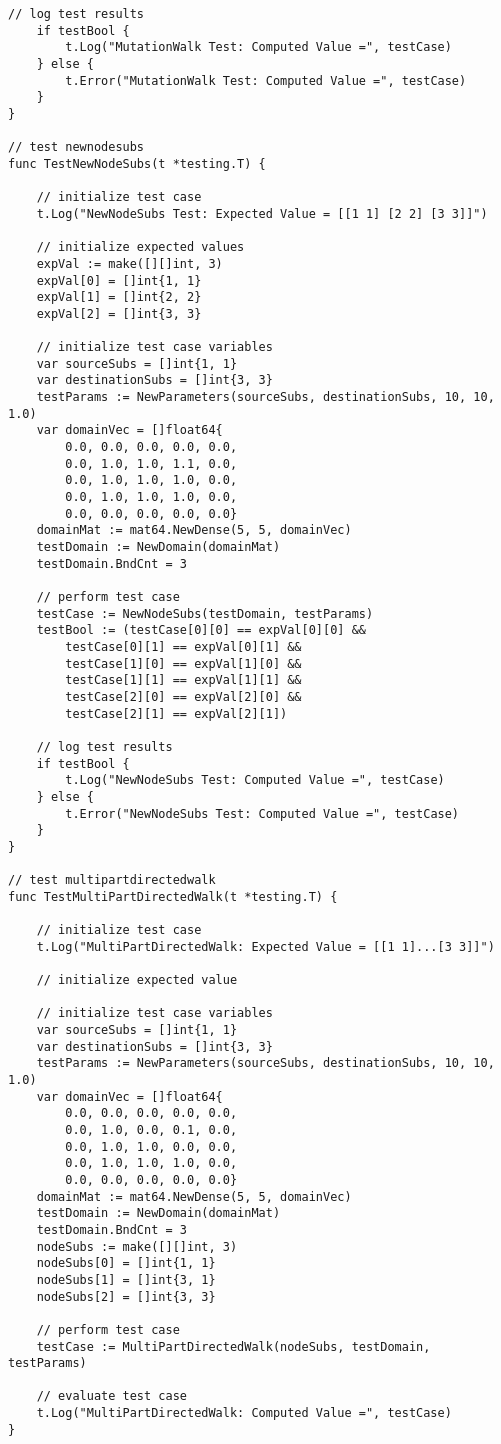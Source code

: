 \begin{lstlisting}[basicstyle=\tiny]
	// log test results
	if testBool {
		t.Log("MutationWalk Test: Computed Value =", testCase)
	} else {
		t.Error("MutationWalk Test: Computed Value =", testCase)
	}
}

// test newnodesubs
func TestNewNodeSubs(t *testing.T) {

	// initialize test case
	t.Log("NewNodeSubs Test: Expected Value = [[1 1] [2 2] [3 3]]")

	// initialize expected values
	expVal := make([][]int, 3)
	expVal[0] = []int{1, 1}
	expVal[1] = []int{2, 2}
	expVal[2] = []int{3, 3}

	// initialize test case variables
	var sourceSubs = []int{1, 1}
	var destinationSubs = []int{3, 3}
	testParams := NewParameters(sourceSubs, destinationSubs, 10, 10, 1.0)
	var domainVec = []float64{
		0.0, 0.0, 0.0, 0.0, 0.0,
		0.0, 1.0, 1.0, 1.1, 0.0,
		0.0, 1.0, 1.0, 1.0, 0.0,
		0.0, 1.0, 1.0, 1.0, 0.0,
		0.0, 0.0, 0.0, 0.0, 0.0}
	domainMat := mat64.NewDense(5, 5, domainVec)
	testDomain := NewDomain(domainMat)
	testDomain.BndCnt = 3

	// perform test case
	testCase := NewNodeSubs(testDomain, testParams)
	testBool := (testCase[0][0] == expVal[0][0] &&
		testCase[0][1] == expVal[0][1] &&
		testCase[1][0] == expVal[1][0] &&
		testCase[1][1] == expVal[1][1] &&
		testCase[2][0] == expVal[2][0] &&
		testCase[2][1] == expVal[2][1])

	// log test results
	if testBool {
		t.Log("NewNodeSubs Test: Computed Value =", testCase)
	} else {
		t.Error("NewNodeSubs Test: Computed Value =", testCase)
	}
}

// test multipartdirectedwalk
func TestMultiPartDirectedWalk(t *testing.T) {

	// initialize test case
	t.Log("MultiPartDirectedWalk: Expected Value = [[1 1]...[3 3]]")

	// initialize expected value

	// initialize test case variables
	var sourceSubs = []int{1, 1}
	var destinationSubs = []int{3, 3}
	testParams := NewParameters(sourceSubs, destinationSubs, 10, 10, 1.0)
	var domainVec = []float64{
		0.0, 0.0, 0.0, 0.0, 0.0,
		0.0, 1.0, 0.0, 0.1, 0.0,
		0.0, 1.0, 1.0, 0.0, 0.0,
		0.0, 1.0, 1.0, 1.0, 0.0,
		0.0, 0.0, 0.0, 0.0, 0.0}
	domainMat := mat64.NewDense(5, 5, domainVec)
	testDomain := NewDomain(domainMat)
	testDomain.BndCnt = 3
	nodeSubs := make([][]int, 3)
	nodeSubs[0] = []int{1, 1}
	nodeSubs[1] = []int{3, 1}
	nodeSubs[2] = []int{3, 3}

	// perform test case
	testCase := MultiPartDirectedWalk(nodeSubs, testDomain, testParams)

	// evaluate test case
	t.Log("MultiPartDirectedWalk: Computed Value =", testCase)
}

\end{lstlisting}

